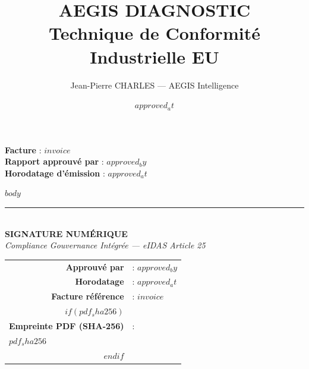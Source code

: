 \documentclass[a4paper,11pt]{article}
\title{\color{aegisblue}\textbf{AEGIS DIAGNOSTIC}\\[0.3em]
       \large Technique de Conformité Industrielle EU}
\author{Jean-Pierre CHARLES --- AEGIS Intelligence}
\date{$approved_at$}
\begin{document}

\maketitle
\thispagestyle{fancy}

\begin{center}
\color{aegismuted}\small
\textbf{Facture} : $invoice$\\
\textbf{Rapport approuvé par} : $approved_by$\\
\textbf{Horodatage d'émission} : $approved_at$
\end{center}

\vspace{1.5em}

$body$

\vfill
\clearpage

\begin{center}
\rule{0.6\textwidth}{0.4pt}\\[1em]
{\color{aegisemerald}\Large\textbf{SIGNATURE NUMÉRIQUE}}\\[0.5em]
{\small\color{aegismuted}\itshape Compliance Gouvernance Intégrée --- eIDAS Article 25}
\end{center}

\vspace{1em}

\begin{center}
\begin{tabular}{rl}
\textbf{Approuvé par} & : $approved_by$ \\[0.4em]
\textbf{Horodatage} & : $approved_at$ \\[0.4em]
\textbf{Facture référence} & : $invoice$ \\
$if(pdf_sha256)$
\\[0.4em]
\textbf{Empreinte PDF (SHA-256)} & : \\
\multicolumn{2}{l}{\texttt{\footnotesize $pdf_sha256$}} \\
$endif$
\end{tabular}
\end{center}
\end{document}
